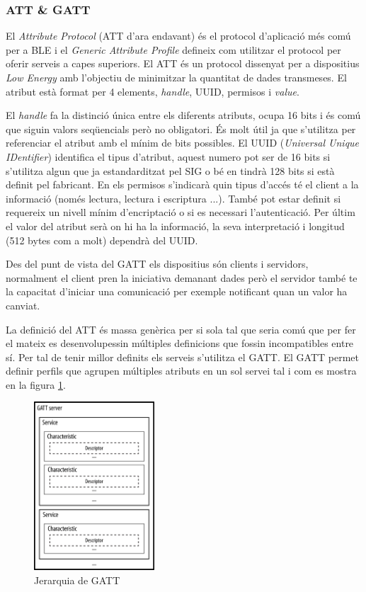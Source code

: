 \subsubsection{ATT \& GATT}
El \textit{Attribute Protocol} (ATT d'ara endavant) és el protocol d'aplicació més comú per a BLE i el \textit{Generic Attribute Profile} defineix com utilitzar el protocol per oferir serveis a capes superiors.
El ATT és un protocol dissenyat per a dispositius \textit{Low Energy} amb l'objectiu de minimitzar la quantitat de dades transmeses. El atribut està format per 4 elements, \textit{handle}, UUID, permisos  i \textit{value}.

El \textit{handle} fa la distinció única entre els diferents atributs, ocupa 16 bits i és comú que siguin valors seqüencials però no obligatori. És molt útil ja que s'utilitza per referenciar el atribut amb el mínim de bits possibles.
El UUID (\textit{Universal Unique IDentifier}) identifica el tipus d'atribut, aquest numero pot ser de 16 bits si s'utilitza algun que ja estandarditzat pel SIG o bé en tindrà 128 bits si està definit pel fabricant.
En els permisos s'indicarà quin tipus d'accés té el client a la informació (només lectura, lectura i escriptura ...). També pot estar definit si requereix un nivell mínim d'encriptació o si es necessari l'autenticació.
Per últim el valor del atribut serà on hi ha la informació, la seva interpretació i longitud (512 bytes com a molt) dependrà del UUID.

Des del punt de vista del GATT els dispositius són clients i servidors, normalment el client pren la iniciativa demanant dades però el servidor també te la capacitat d'iniciar una comunicació per exemple notificant quan un valor ha canviat.

La definició del ATT és massa genèrica per si sola tal que seria comú que per fer el mateix es desenvolupessin múltiples definicions que fossin incompatibles entre sí.
Per tal de tenir millor definits els serveis s'utilitza el GATT.
El GATT permet definir perfils que agrupen múltiples atributs en un sol servei \cite{services} tal i com es mostra en la figura \ref{fig:Gatt_Hierarchy}.

\begin{figure}[h!]
	\begin{center}
		\includegraphics[width=0.4\textwidth]{./images/GATT_Hierarchy.png}
		\caption{Jerarquia de GATT \cite{GATT_Hierarchy}}
		\label{fig:Gatt_Hierarchy}
	\end{center}
\end{figure}

